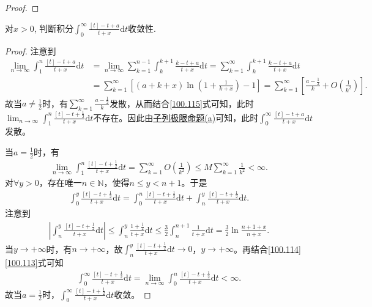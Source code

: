 \documentclass[../../main.tex]{subfiles}
\begin{document}
\begin{proof}
\end{proof}

\begin{example}
对$x > 0$, 判断积分$\int_0^{\infty} \frac{[t] - t + a}{t + x} \mathrm{d}t$收敛性.
\end{example}
\begin{proof}
注意到
\begin{align}
\lim_{n\to\infty}\int_1^n\frac{[t] - t + a}{t + x}\mathrm{d}t &= \lim_{n\to\infty}\sum_{k=1}^{n-1}\int_k^{k+1}\frac{k - t + a}{t + x}\mathrm{d}t = \sum_{k=1}^{\infty}\int_k^{k+1}\frac{k - t + a}{t + x}\mathrm{d}t\nonumber\\
&= \sum_{k=1}^{\infty}\left[(a + k + x)\ln\left(1 + \frac{1}{k + x}\right) - 1\right] = \sum_{k=1}^{\infty}\left[\frac{a - \frac{1}{2}}{k} + O\left(\frac{1}{k^2}\right)\right].\label{100.115}
\end{align}
故当$a \ne \frac{1}{2}$时，有$\sum_{k=1}^{\infty}\frac{a - \frac{1}{2}}{k}$发散，从而结合\eqref{100.115}式可知，此时$\lim_{n\to\infty}\int_1^n\frac{[t] - t + \frac{1}{2}}{t + x}\mathrm{d}t$不存在。因此由\hyperref[proposition:子列极限命题]{子列极限命题(a)}可知，此时$\int_0^{\infty}\frac{[t] - t + a}{t + x}\mathrm{d}t$发散。

当$a = \frac{1}{2}$时，有
\begin{align}
\lim_{n\to\infty}\int_1^n\frac{[t] - t + \frac{1}{2}}{t + x}\mathrm{d}t = \sum_{k=1}^{\infty}O\left(\frac{1}{k^2}\right) \leqslant M\sum_{k=1}^{\infty}\frac{1}{k^2} < \infty.\label{100.114}
\end{align}
对$\forall y > 0$，存在唯一$n \in \mathbb{N}$，使得$n \leqslant y < n + 1$。于是
\begin{align}
\int_0^y\frac{[t] - t + \frac{1}{2}}{t + x}\mathrm{d}t = \int_0^n\frac{[t] - t + \frac{1}{2}}{t + x}\mathrm{d}t + \int_n^y\frac{[t] - t + \frac{1}{2}}{t + x}\mathrm{d}t.\label{100.113}
\end{align}
注意到
\begin{align*}
\left|\int_n^y\frac{[t] - t + \frac{1}{2}}{t + x}\mathrm{d}t\right| \leqslant \int_n^y\frac{1 + \frac{1}{2}}{t + x}\mathrm{d}t \leqslant \frac{3}{2}\int_n^{n+1}\frac{1}{t + x}\mathrm{d}t = \frac{3}{2}\ln\frac{n + 1 + x}{n + x}.
\end{align*}
当$y \to +\infty$时，有$n \to +\infty$，故$\int_n^y\frac{[t] - t + \frac{1}{2}}{t + x}\mathrm{d}t \to 0$，$y \to +\infty$。再结合\eqref{100.114}\eqref{100.113}式可知
\begin{align*}
\int_0^{\infty}\frac{[t] - t + \frac{1}{2}}{t + x}\mathrm{d}t = \lim_{n\to\infty}\int_0^n\frac{[t] - t + \frac{1}{2}}{t + x}\mathrm{d}t < \infty.
\end{align*}
故当$a = \frac{1}{2}$时，$\int_0^{\infty}\frac{[t] - t + \frac{1}{2}}{t + x}\mathrm{d}t$收敛。

\end{proof}
\end{document}
